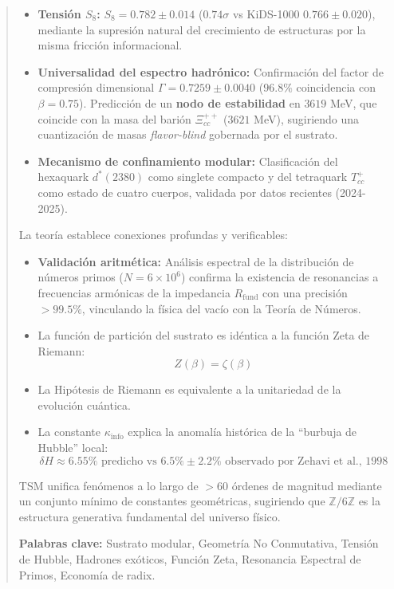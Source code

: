 \documentclass[11pt, a4paper]{article}
\theoremstyle{plain}
\theoremstyle{definition}
\newcommand{\Rfactor}{R_{\text{fund}}}
\newcommand{\Kinfo}{\kappa_{\text{info}}}
\begin{document}
\begin{abstract}
\begin{itemize}
    \item \textbf{Tensión $S_8$:} $S_8 = 0.782 \pm 0.014$ ($0.74\sigma$ vs KiDS-1000 $0.766 \pm 0.020$), mediante la supresión natural del crecimiento de estructuras por la misma fricción informacional.
    
    \item \textbf{Universalidad del espectro hadrónico:} Confirmación del factor de compresión dimensional $\Gamma = 0.7259 \pm 0.0040$ ($96.8\%$ coincidencia con $\beta = 0.75$). Predicción de un \textbf{nodo de estabilidad} en $3619$ MeV, que coincide con la masa del barión $\Xi_{cc}^{++}$ ($3621$ MeV), sugiriendo una cuantización de masas \textit{flavor-blind} gobernada por el sustrato.
    
    \item \textbf{Mecanismo de confinamiento modular:} Clasificación del hexaquark $d^*(2380)$ como singlete compacto y del tetraquark $T_{cc}^+$ como estado de cuatro cuerpos, validada por datos recientes (2024-2025).
\end{itemize}

La teoría establece conexiones profundas y verificables:

\begin{itemize}
    \item \textbf{Validación aritmética:} Análisis espectral de la distribución de números primos ($N=6\times 10^6$) confirma la existencia de resonancias a frecuencias armónicas de la impedancia $\Rfactor$ con una precisión $>99.5\%$, vinculando la física del vacío con la Teoría de Números.
    \item La función de partición del sustrato es idéntica a la función Zeta de Riemann:
\[ Z(\beta) = \zeta(\beta) \]
    \item La Hipótesis de Riemann es equivalente a la unitariedad de la evolución cuántica.
    \item La constante $\Kinfo$ explica la anomalía histórica de la ``burbuja de Hubble'' local:
\[ \delta H \approx 6.55\% \text{ predicho vs } 6.5\% \pm 2.2\% \text{ observado por Zehavi et al., 1998} \]
\end{itemize}

TSM unifica fenómenos a lo largo de $>60$ órdenes de magnitud mediante un conjunto mínimo de constantes geométricas, sugiriendo que $\mathbb{Z}/6\mathbb{Z}$ es la estructura generativa fundamental del universo físico.

\vspace{0.5cm}
\noindent\textbf{Palabras clave:} Sustrato modular, Geometría No Conmutativa, Tensión de Hubble, Hadrones exóticos, Función Zeta, Resonancia Espectral de Primos, Economía de radix.
\end{abstract}
\end{document}
